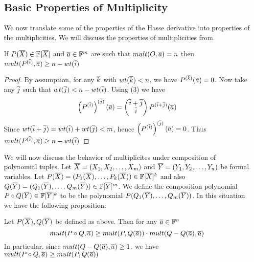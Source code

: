 \subsection{Basic Properties of Multiplicity}
We now translate some of the properties of the Hasse derivative into properties of the multiplicities. We will discuss the properties of multiplicities from \cite{dvir2009extensions}
\begin{proposition}
	If $P(\overline{X})\in \mathbb{F}[\overline{X}]$ and $\overline{a}\in \mathbb{F}^m$ are such that $mult(O,\overline{a})=n$ then $mult(P^{(\overline{i})},\overline{a})\geq n-wt(\overline{i})$
\end{proposition}
\begin{proof}
	By assumption, for any $\overline{k}$ with $wt(\overline{k})<n$, we have $P^{(\overline{k})}(\overline{a})=0$. Now take any $\overline{j}$ such that $wt(\overline{j})<n-wt(\overline{i})$. Using  (3) we have $$\left(P^{(\overline{i})}\right)^{(\overline{j})}(\overline{a})=\left(\begin{matrix} \overline{i}+\overline{j}\\ \overline{i} \end{matrix}\right)P^{(\overline{i}+\overline{j})}(\overline{a})$$Since $wt(\overline{i}+\overline{j})=wt(\overline{i})+wt(\overline{j})<m$, hence $\left(P^{(\overline{i})}\right)^{(\overline{j})}(\overline{a})=0$. Thus $mult(P^{(\overline{i})},\overline{a})\geq n-wt(\overline{i})$
\end{proof}
We will now discuss the behavior of multiplicites under composition of polynomial tuples. Let $\overline{X}=(X_1,X_2,\dots, X_m)$ and $\overline{Y}=(Y_1,Y_2,\dots, Y_n)$ be formal variables. Let $P(\overline{X})=(P_1(\overline{X}),\dots, P_k(\overline{X}))\in \mathbb{F}[\overline{X}]^k$ and also $Q(\overline{Y})=(Q_1(\overline{Y}), \dots, Q_m(\overline{Y}))\in \mathbb{F}[\overline{Y}]^m$. We define the composition polynomial $P\circ Q(\overline{Y})\in \mathbb{F}[\overline{Y}]^k$ to be the polynomial $P(Q_1(\overline{Y}),\dots, Q_m(\overline{Y}))$. In this situation we have the following proposition:
\begin{proposition}\label{composepolymult}
	Let $P(\overline{X}), Q(\overline{Y})$ be defined as above. Then for any $\overline{a}\in \mathbb{F}^n$ $$mult(P\circ Q,\overline{a})\geq mult(P,Q(\overline{a}))\cdot mult(Q-Q(\overline{a}),\overline{a})$$In particular, since $mult(Q-Q(\overline{a}),\overline{a})\geq 1$, we have $mult(P\circ Q,\overline{a})\geq mult(P,Q(\overline{a}))$
\end{proposition}

